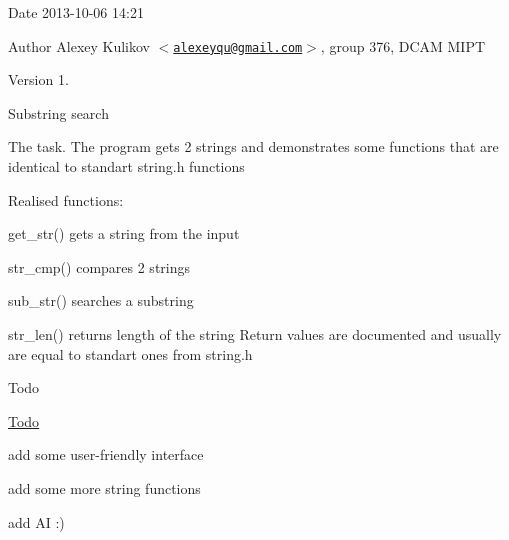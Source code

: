 \begin{DoxyDate}{\-Date}
2013-\/10-\/06 14\-:21 
\end{DoxyDate}
\begin{DoxyAuthor}{\-Author}
\-Alexey \-Kulikov $<$\href{mailto:alexeyqu@gmail.com}{\tt alexeyqu@gmail.\-com}$>$, group 376, \-D\-C\-A\-M \-M\-I\-P\-T 
\end{DoxyAuthor}
\begin{DoxyVersion}{\-Version}
1.
\end{DoxyVersion}
\-Substring search

\begin{DoxyParagraph}{\-The task.}
\-The program gets 2 strings and demonstrates some functions that are identical to standart string.\-h functions
\end{DoxyParagraph}
\begin{DoxyParagraph}{\-Realised functions\-:}

\begin{DoxyItemize}
\item get\-\_\-str() gets a string from the input
\item str\-\_\-cmp() compares 2 strings
\item sub\-\_\-str() searches a substring
\item str\-\_\-len() returns length of the string \-Return values are documented and usually are equal to standart ones from string.\-h
\end{DoxyItemize}
\end{DoxyParagraph}
\begin{DoxyRefDesc}{\-Todo}
\item[\hyperlink{todo__todo000001}{\-Todo}]
\begin{DoxyItemize}
\item add some user-\/friendly interface
\begin{DoxyItemize}
\item add some more string functions
\item add \-A\-I \-:) 
\end{DoxyItemize}
\end{DoxyItemize}\end{DoxyRefDesc}
